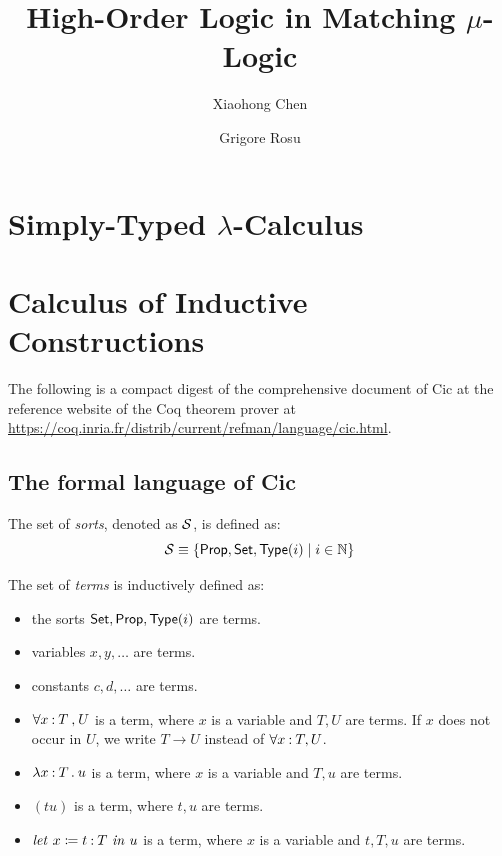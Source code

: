 \documentclass[letter,12pt]{amsart}
\begin{document}
\title{High-Order Logic in Matching $\mu$-Logic}
\author{Xiaohong Chen}
\author{Grigore Rosu}


\maketitle

\tableofcontents

\section{Simply-Typed $\lambda$-Calculus}

\section{Calculus of Inductive Constructions}

The following is a compact digest of
the comprehensive document of Cic
at the reference website of the Coq theorem prover
at \url{https://coq.inria.fr/distrib/current/refman/language/cic.html}.

\subsection{The formal language of Cic}

\begin{definition}
The set of \emph{sorts},
denoted as $\mathcal{S}$, is defined as:
\begin{equation}
\mathcal{S} \equiv \{ \mathsf{Prop}, \mathsf{Set}, \mathsf{Type}(i) \mid i \in \mathbb{N} \}
\end{equation}
\end{definition}

\begin{definition}
The set of \emph{terms} is inductively defined as:
\begin{itemize}
\item the sorts $\mathsf{Set}, \mathsf{Prop}, \mathsf{Type}(i)$ are terms.
\item variables $x,y,\dots$ are terms.
\item constants $c,d,\dots$ are terms.
\item $\forall x \mathbin{:} T \mathbin{,} U$ is a term, 
where $x$ is a variable and $T,U$ are terms.
If $x$ does not occur in $U$, we write $T \to U$ instead of
$\forall x \mathbin{:} T , U$.
\item $\lambda x \mathbin{:} T \mathbin{.} u$ is a term,
where $x$ is a variable and $T, u$ are terms.
\item $(t u)$ is a term,
where $t,u$ are terms.
\item $\mathit{let}\ x \coloneq t \cln T \ \mathit{in}\ u$ is a term,
where $x$ is a variable and $t,T,u$ are terms.
\end{itemize}
\end{definition}
\end{document}
